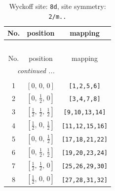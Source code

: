 \documentclass[fleqn,8pt]{jsarticle}
\begin{document}
\begin{longtable}{ccc}
\caption{Wyckoff site: {\tt 8d}, site symmetry: {\tt 2/m..}}
 \\
 \hline \hline
No. & position & mapping \\ \hline \endfirsthead

\multicolumn{2}{l}{\tablename\ \thetable{}} \\
 \hline \hline
No. & position & mapping \\ \hline \endhead

 \hline \hline
\multicolumn{2}{r}{\footnotesize\it continued ...} \\ \endfoot

 \hline \hline
\multicolumn{2}{r}{} \\ \endlastfoot

1 & $\left[ 0,\, 0,\, 0 \right]$ & {\tt [1,2,5,6]} \\ \hline
2 & $\left[ 0,\, \frac{1}{2},\, 0 \right]$ & {\tt [3,4,7,8]} \\ \hline
3 & $\left[ \frac{1}{2},\, \frac{1}{2},\, \frac{1}{2} \right]$ & {\tt [9,10,13,14]} \\ \hline
4 & $\left[ \frac{1}{2},\, 0,\, \frac{1}{2} \right]$ & {\tt [11,12,15,16]} \\ \hline
5 & $\left[ 0,\, 0,\, \frac{1}{2} \right]$ & {\tt [17,18,21,22]} \\ \hline
6 & $\left[ 0,\, \frac{1}{2},\, \frac{1}{2} \right]$ & {\tt [19,20,23,24]} \\ \hline
7 & $\left[ \frac{1}{2},\, \frac{1}{2},\, 0 \right]$ & {\tt [25,26,29,30]} \\ \hline
8 & $\left[ \frac{1}{2},\, 0,\, 0 \right]$ & {\tt [27,28,31,32]} \\
\end{longtable}
\renewcommand{\arraystretch}{1.2}
\end{document}
